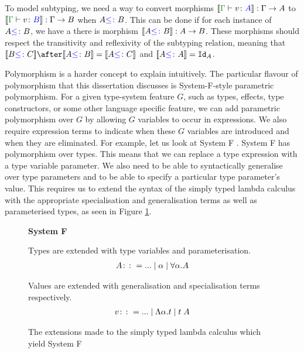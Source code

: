 \documentclass{Report}
\begin{document}
To model subtyping, we need a way to convert morphisms $\deno{\gtyperelation{v}{A}}: \G\rightarrow A$ to $\deno{\gtyperelation{v}{B}}:\G\rightarrow B$ when $A{\color{blue} \leq\colon} B$. This can be done if for each instance of $A{\color{blue} \leq\colon} B$, we have a there is morphism ${\bf [\![}A{\color{blue} \leq\colon} B{\bf ]\!]}: A \rightarrow B$. These morphisms should respect the transitivity and reflexivity of the subtyping relation, meaning that $\deno{B\subtype C}\after\deno{A\subtype B} = \deno{A\subtype C}$ and ${\bf [\![}A{\color{blue} \leq\colon} A{\bf ]\!]} = \texttt{Id}_{A}$.

Polymorphism is a harder concept to explain intuitively. The particular flavour of polymorphism that this dissertation discusses is System-F-style parametric polymorphism. For a given type-system feature $G$, such as types, effects, type constructors, or some other language specific feature, we can add parametric polymorphism over $G$ by allowing $G$ variables to occur in expressions. We also require expression terms to indicate when these $G$ variables are introduced and when they are eliminated. For example, let us look at System F \cite{SystemFIntroduction}. System F has polymorphism over types. This means that we can replace a type expression with a type variable parameter. We also need to be able to syntactically generalise over type parameters and to be able to specify a particular type parameter's value. This requires us to extend the syntax of the simply typed lambda calculus with the appropriate specialisation and generalisation terms as well as parameterised types, as seen in Figure \ref{SystemFTermsTypes}.

\begin{figure}
    \begin{framed}
        \centering
        \textbf{System F}

        Types are extended with type variables and parameterisation.
        \begin{align*}
            A \colon\colon= ... \mid \alpha\mid \forall \alpha. A
        \end{align*}

        Values are extended with generalisation and specialisation terms respectively.
        \begin{align*}
            v \colon\colon= ... \mid \Lambda \alpha. t\mid t\; A
        \end{align*}
    \end{framed}
    \caption{The extensions made to the simply typed lambda calculus which yield System F}
    \label{SystemFTermsTypes}
\end{figure}
\end{document}
